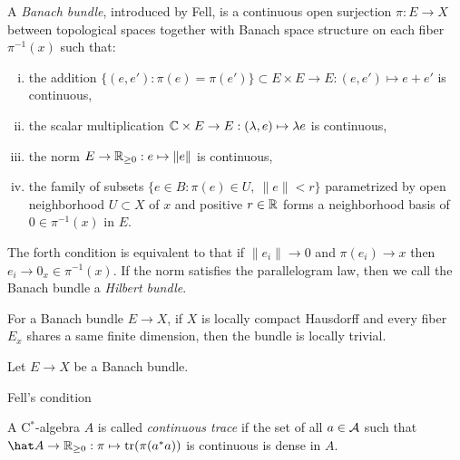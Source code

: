 \documentclass{../../large}
\begin{document}
\begin{prb}
A \emph{Banach bundle}, introduced by Fell, is a continuous open surjection $\pi:E\to X$ between topological spaces together with Banach space structure on each fiber $\pi^{-1}(x)$ such that:
\begin{enumerate}[(i)]
\item the addition $\{(e,e'):\pi(e)=\pi(e')\}\subset E\times E\to E:(e,e')\mapsto e+e'$ is continuous,
\item the scalar multiplication $\mathbb{C}\times E\to E:(\lambda,e)\mapsto\lambda e$ is continuous,
\item the norm $E\to\mathbb{R}_{\ge0}:e\mapsto\|e\|$ is continuous,
\item the family of subsets $\{e\in B:\pi(e)\in U,\ \|e\|<r\}$ parametrized by open neighborhood $U\subset X$ of $x$ and positive $r\in\mathbb{R}$ forms a neighborhood basis of $0\in\pi^{-1}(x)$ in $E$.
\end{enumerate}
The forth condition is equivalent to that if $\|e_i\|\to0$ and $\pi(e_i)\to x$ then $e_i\to 0_x\in\pi^{-1}(x)$.
If the norm satisfies the parallelogram law, then we call the Banach bundle a \emph{Hilbert bundle}.
\begin{parts}
\item For a Banach bundle $E\to X$, if $X$ is locally compact Hausdorff and every fiber $E_x$ shares a same finite dimension, then the bundle is locally trivial.
\end{parts}
\end{prb}


\begin{prb}
\end{prb}


\begin{prb}
Let $E\to X$ be a Banach bundle.
\end{prb}



Fell's condition

A C$^*$-algebra $A$ is called \emph{continuous trace} if the set of all $a\in\mathcal{A}$ such that $\hat A\to\R_{\ge0}:\pi\mapsto\tr(\pi(a^*a))$ is continuous is dense in $A$.
\end{document}
